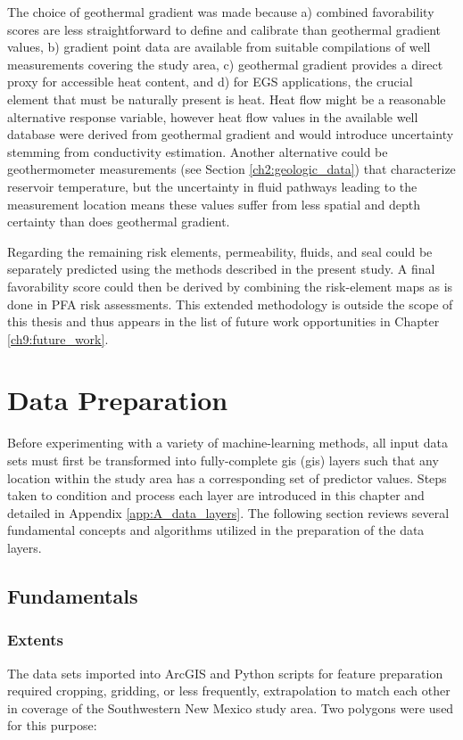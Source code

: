 The choice of geothermal gradient was made because a) combined favorability scores are less straightforward to define and calibrate than geothermal gradient values, b) gradient point data are available from suitable compilations of well measurements covering the study area, c) geothermal gradient provides a direct proxy for accessible heat content, and d) for EGS applications, the crucial element that must be naturally present is heat. Heat flow might be a reasonable alternative response variable, however heat flow values in the available well database were derived from geothermal gradient and would introduce uncertainty stemming from conductivity estimation. Another alternative could be geothermometer measurements (see Section \ref{ch2:geologic_data}) that characterize reservoir temperature, but the uncertainty in fluid pathways leading to the measurement location means these values suffer from less spatial and depth certainty than does geothermal gradient.

Regarding the remaining risk elements, permeability, fluids, and seal could be separately predicted using the methods described in the present study. A final favorability score could then be derived by combining the risk-element maps as is done in PFA risk assessments. This extended methodology is outside the scope of this thesis and thus appears in the list of future work opportunities in Chapter \ref{ch9:future_work}.

\section{Data Preparation}\label{ch3:data_prep}
Before experimenting with a variety of machine-learning methods, all input data sets must first be transformed into fully-complete \acrlong{gis} (\acrshort{gis}) layers such that any location within the study area has a corresponding set of predictor values. Steps taken to condition and process each layer are introduced in this chapter and detailed in Appendix \ref{app:A_data_layers}. The following section reviews several fundamental concepts and algorithms utilized in the preparation of the data layers.

\subsection{Fundamentals}\label{ch3:data_prep_fundamentals}
\subsubsection{Extents}\label{ch3:extents}
The data sets imported into ArcGIS and Python scripts for feature preparation required cropping, gridding, or less frequently, extrapolation to match each other in coverage of the Southwestern New Mexico study area. Two polygons were used for this purpose:

